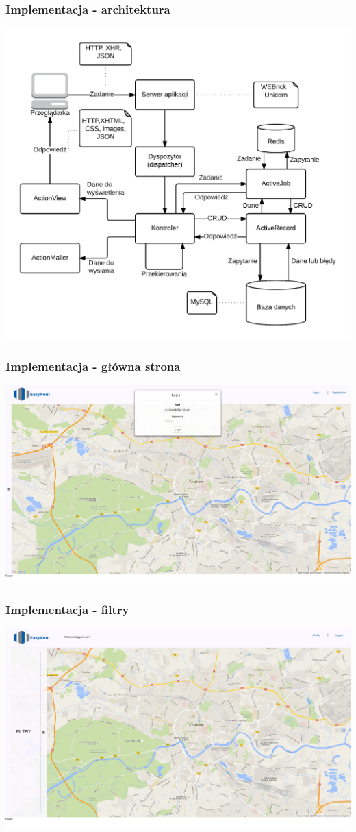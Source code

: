 \documentclass{beamer}
\begin{document}
\begin{frame}
\frametitle{Implementacja - architektura}
\centerline{\includegraphics[scale=0.5]{pictures/architecture.png}}
\end{frame}


\begin{frame}
\frametitle{Implementacja - główna strona}
\centerline{\includegraphics[scale=0.15]{pictures/before_login.png}}
\end{frame}


\begin{frame}
\frametitle{Implementacja - filtry}
\centerline{\includegraphics[scale=0.15]{pictures/after_login.png}}
\end{frame}

\end{document}
